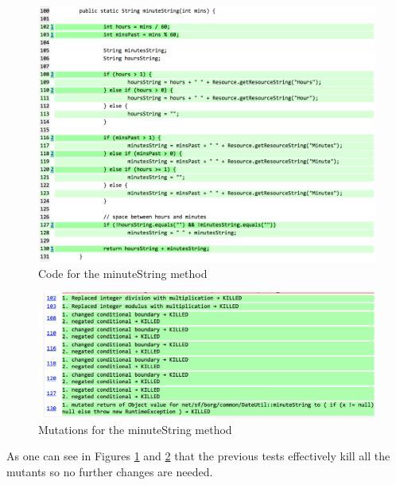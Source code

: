 \documentclass[fontsize=12pt,paper=letter,twoside]{scrartcl}
\begin{document}
\begin{figure}[!htb]
\begin{center}
\includegraphics[width=.99\textwidth]{images/MutationTesting/minuteStringCode.png}
\end{center}
\caption{Code for the minuteString method}
\label{fig:minuteStringCode}
\end{figure}

\clearpage
\begin{figure}[!htb]
\begin{center}
\includegraphics[width=.99\textwidth]{images/MutationTesting/minuteStringMutant.png}
\end{center}
\caption{Mutations for the minuteString method}
\label{fig:minuteStringMutant}
\end{figure}

As one can see in Figures \ref{fig:minuteStringCode} and \ref{fig:minuteStringMutant} that the previous tests effectively kill all the mutants so no further changes are needed.
\end{document}
